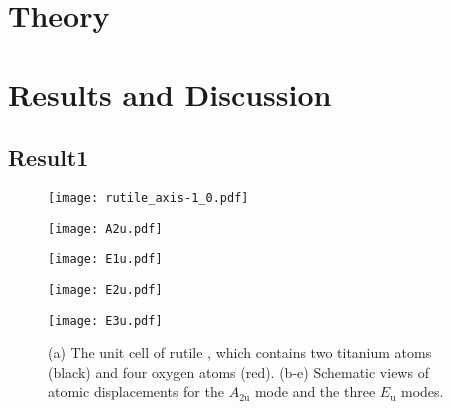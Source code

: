 \documentclass[luatex,twocolumn,showpacs,aps,prb,reprint,amsfonts,amsmath,amssymb,floatfix,groupedaddress, longbibliography]{revtex4-2}
\begin{document}
\section{Theory}\label{sec:theory}

\lipsum[1-10]




\section{Results and Discussion}\label{sec:result}
\subsection{Result1}\label{subsec:result1}

\lipsum[1-5]

\begin{figure}[t]
\hfill
\centering
\begin{subcaptionblock}{0.6\linewidth}
\centering
\texttt{[image: rutile\_axis-1\_0.pdf]}
\subcaption{}
\end{subcaptionblock}\hfill
\begin{subcaptionblock}{0.4\linewidth}
\centering
\texttt{[image: A2u.pdf]}
\end{subcaptionblock}\hfill
\begin{subcaptionblock}{0.3\linewidth}
\centering
\texttt{[image: E1u.pdf]}
\end{subcaptionblock}\hfill
\begin{subcaptionblock}{0.3\linewidth}
\centering
\texttt{[image: E2u.pdf]}
\end{subcaptionblock}\hfill
\begin{subcaptionblock}{0.3\linewidth}
\centering
\texttt{[image: E3u.pdf]}
\end{subcaptionblock}\hfill
\caption{(a) The unit cell of rutile , which contains two titanium atoms (black) and four oxygen atoms (red). (b-e) Schematic views of atomic displacements for the $A_{\mathrm{2u}}$ mode and the three $E_{\mathrm{u}}$ modes. }
\label{fig:crystal}
\end{figure}
\end{document}

